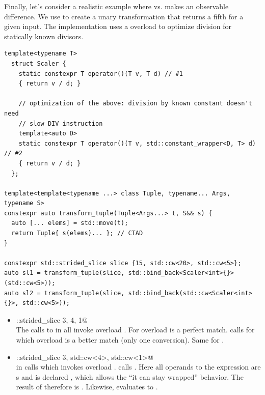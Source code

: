 Finally, let's consider a realistic example where  vs.
 makes an observable difference.
We use \std{} to create a unary transformation that returns a fifth for a given input.
The  implementation uses a  overload to optimize division for
statically known divisors.

\medskip\begin{lstlisting}
template<typename T>
  struct Scaler {
    static constexpr T operator()(T v, T d) // #1
    { return v / d; }

    // optimization of the above: division by known constant doesn't need
    // slow DIV instruction
    template<auto D>
    static constexpr T operator()(T v, std::constant_wrapper<D, T> d) // #2
    { return v / d; }
  };

template<template<typename ...> class Tuple, typename... Args, typename S>
constexpr auto transform_tuple(Tuple<Args...> t, S&& s) {
  auto [... elems] = std::move(t);
  return Tuple{ s(elems)... }; // CTAD
}

constexpr std::strided_slice slice {15, std::cw<20>, std::cw<5>};
auto sl1 = transform_tuple(slice, std::bind_back<Scaler<int>{}>(std::cw<5>));
auto sl2 = transform_tuple(slice, std::bind_back(std::cw<Scaler<int>{}>, std::cw<5>));
\end{lstlisting}

\begin{itemize}
  \item [\code{sl1}:] \lstinline@std::strided_slice {3, 4, 1}@\\
    The calls to  in  all invoke overload .
    For  overload  is a perfect match.
     calls  for which overload  is
    a better match (only one conversion).
    Same for .

  \item [\code{sl2}:] \lstinline@std::strided_slice {3, std::cw<4>, std::cw<1>}@\\
     in  calls 
    which invokes overload .
     calls .
    Here all operands to the expression are s and  is
    declared , which allows the “it can stay wrapped” behavior.
    The result of  therefore is .
    Likewise,  evaluates to .
\end{itemize}

